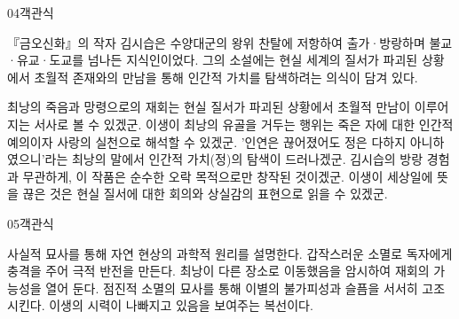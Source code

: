 \documentclass[fs85,seriesWit]{korfarm-base}
\begin{document}
\begin{kfQBlock}{04}{객관식}
\begin{kfEvidence}『금오신화』의 작자 김시습은 수양대군의 왕위 찬탈에 저항하여 출가·방랑하며 불교·유교·도교를 넘나든 지식인이었다. 그의 소설에는 현실 세계의 질서가 파괴된 상황에서 초월적 존재와의 만남을 통해 인간적 가치를 탐색하려는 의식이 담겨 있다.\end{kfEvidence}
\begin{kfChoices}
\kfChoice 최낭의 죽음과 망령으로의 재회는 현실 질서가 파괴된 상황에서 초월적 만남이 이루어지는 서사로 볼 수 있겠군.
\kfChoice 이생이 최낭의 유골을 거두는 행위는 죽은 자에 대한 인간적 예의이자 사랑의 실천으로 해석할 수 있겠군.
\kfChoice '인연은 끊어졌어도 정은 다하지 아니하였으니'라는 최낭의 말에서 인간적 가치(정)의 탐색이 드러나겠군.
\kfChoice 김시습의 방랑 경험과 무관하게, 이 작품은 순수한 오락 목적으로만 창작된 것이겠군.
\kfChoice 이생이 세상일에 뜻을 끊은 것은 현실 질서에 대한 회의와 상실감의 표현으로 읽을 수 있겠군.
\end{kfChoices}
\end{kfQBlock}

\begin{kfQBlock}{05}{객관식}
\begin{kfChoices}
\kfChoice 사실적 묘사를 통해 자연 현상의 과학적 원리를 설명한다.
\kfChoice 갑작스러운 소멸로 독자에게 충격을 주어 극적 반전을 만든다.
\kfChoice 최낭이 다른 장소로 이동했음을 암시하여 재회의 가능성을 열어 둔다.
\kfChoice 점진적 소멸의 묘사를 통해 이별의 불가피성과 슬픔을 서서히 고조시킨다.
\kfChoice 이생의 시력이 나빠지고 있음을 보여주는 복선이다.
\end{kfChoices}
\end{kfQBlock}

\kfEndMC
\end{document}
